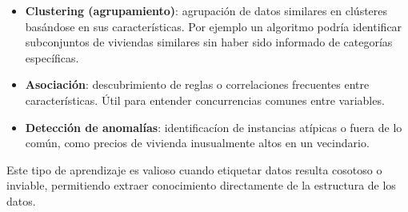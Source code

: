 \documentclass[11pt]{article} %
\begin{document}
\begin{itemize}
    \begin{itemize}
        \item \textbf{Clustering (agrupamiento)}: agrupación de datos similares en clústeres basándose en sus características. Por ejemplo un algoritmo podría identificar subconjuntos de viviendas similares sin haber sido informado de categorías específicas.
        \item\textbf{Asociación}: descubrimiento de reglas o correlaciones frecuentes entre características. Útil para entender concurrencias comunes entre variables.
        \item\textbf{Detección de anomalías}: identificacíon de instancias atípicas o fuera de lo común, como precios de vivienda inusualmente altos en un vecindario.
    \end{itemize}
    Este tipo de aprendizaje es valioso cuando etiquetar datos resulta cosotoso o inviable, permitiendo extraer conocimiento directamente de la estructura de los datos.
\end{itemize}
\end{document}
